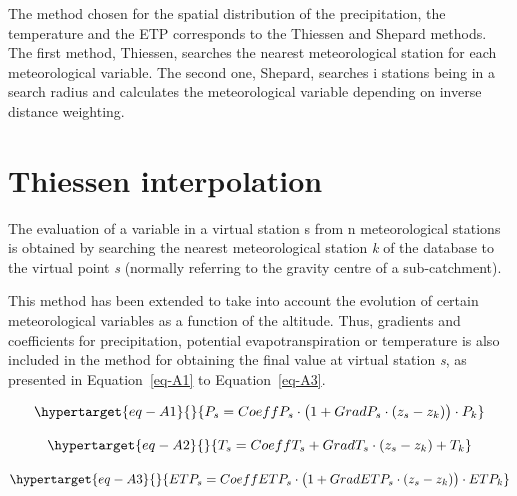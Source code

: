 \documentclass[
  letterpaper,
  DIV=11,
  numbers=noendperiod]{scrreprt}
\begin{document}
The method chosen for the spatial distribution of the precipitation, the
temperature and the ETP corresponds to the Thiessen and Shepard methods.
The first method, Thiessen, searches the nearest meteorological station
for each meteorological variable. The second one, Shepard, searches i
stations being in a search radius and calculates the meteorological
variable depending on inverse distance weighting.

\hypertarget{thiessen-interpolation}{%
\section{Thiessen interpolation}\label{thiessen-interpolation}}

The evaluation of a variable in a virtual station s from n
meteorological stations is obtained by searching the nearest
meteorological station \emph{k} of the database to the virtual point
\emph{s} (normally referring to the gravity centre of a sub-catchment).

This method has been extended to take into account the evolution of
certain meteorological variables as a function of the altitude. Thus,
gradients and coefficients for precipitation, potential
evapotranspiration or temperature is also included in the method for
obtaining the final value at virtual station \emph{s}, as presented in
Equation~\ref{eq-A1} to Equation~\ref{eq-A3}.

\begin{equation}\protect\hypertarget{eq-A1}{}{
P_s=CoeffP_s \cdot \big( 1 + GradP_s \cdot (z_s-z_k) \big) \cdot P_k
}\label{eq-A1}\end{equation}

\begin{equation}\protect\hypertarget{eq-A2}{}{
T_s=CoeffT_s + GradT_s \cdot(z_s-z_k) + T_k
}\label{eq-A2}\end{equation}

\begin{equation}\protect\hypertarget{eq-A3}{}{
ETP_s=CoeffETP_s \cdot\big( 1 + GradETP_s \cdot(z_s-z_k) \big) \cdot ETP_k
}\label{eq-A3}\end{equation}
\end{document}
